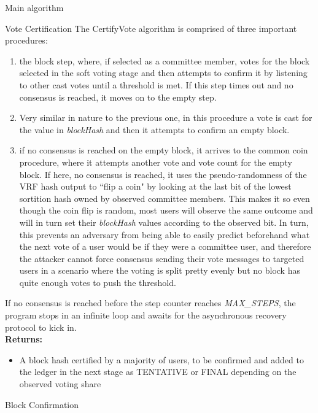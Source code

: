 \documentclass[10pt,a4paper]{article}
\begin{document}
\begin{section}{Main algorithm}
\begin{subsection}{Vote Certification}
The {\sf CertifyVote} algorithm is comprised of three important procedures: 
\begin{enumerate}
    \item the block step, where, if selected as a committee member, votes for the block selected in 
    the soft voting stage and then attempts to confirm it by listening to other cast votes until a 
    threshold is met. If this step times out and no consensus is reached, it moves on to the empty 
    step. 
    \item Very similar in nature to the previous one, in this procedure a vote is cast for the 
    value in {\em blockHash} and then it attempts to confirm an empty block.
    \item if no consensus is reached on the empty block, it arrives to the common coin procedure, 
    where it attempts another vote and vote count for the empty block. 
    If here, no consensus is reached, it uses the pseudo-randomness of the VRF hash output to ``flip a coin" 
    by looking at the last bit of the lowest sortition hash owned by observed committee members.
    This makes it so even though the coin flip is random, most users will observe the same outcome and will 
    in turn set their {\em blockHash} values according to the observed bit. 
    In turn, this prevents an adversary from being able to easily predict beforehand what the next vote 
    of a user would be if they were a committee user, and therefore the attacker cannot force consensus 
    sending their vote messages to targeted users in a scenario where the voting is split pretty evenly 
    but no block has quite enough votes to push the threshold.
\end{enumerate}
If no consensus is reached before the step counter reaches {\em MAX\_STEPS}, 
the program stops in an infinite loop and awaits for the asynchronous recovery
protocol to kick in.\\

\noindent \textbf{Returns:}
\begin{itemize}
    \item A block hash certified by a majority of users, to be confirmed and added to the ledger in the next stage as TENTATIVE or FINAL depending
    on the observed voting share
  \end{itemize}


\end{subsection}
\begin{subsection}{Block Confirmation}\label{ssect:blockconfirmation}


\end{subsection}
\end{section}
\end{document}
